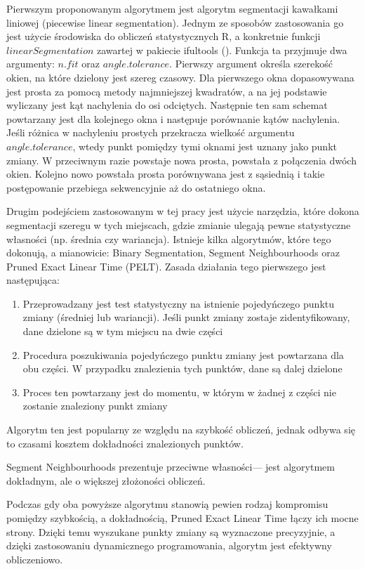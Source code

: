 \documentclass[polish, twoside, 12pt, a4paper]{article}
\theoremstyle{definition}
\theoremstyle{plain}
\theoremstyle{remark}
\begin{document}
Pierwszym proponowanym algorytmem jest algorytm segmentacji kawałkami liniowej (piecewise linear segmentation). Jednym ze sposobów zastosowania go jest użycie środowiska do obliczeń statystycznych R, a konkretnie funkcji \(linearSegmentation\) zawartej w pakiecie ifultools (\cite{ifultools}). Funkcja ta przyjmuje dwa argumenty: \(n.fit\) oraz \(angle.tolerance\). Pierwszy argument określa szerekość okien, na które dzielony jest szereg czasowy. Dla pierwszego okna dopasowywana jest prosta za pomocą metody najmniejszej kwadratów, a na jej podstawie wyliczany jest kąt nachylenia do osi odciętych. Następnie ten sam schemat powtarzany jest dla kolejnego okna i następuje porównanie kątów nachylenia. Jeśli różnica w nachyleniu prostych przekracza wielkość argumentu \(angle.tolerance\), wtedy punkt pomiędzy tymi oknami jest uznany jako punkt zmiany. W przeciwnym razie powstaje nowa prosta, powstała z połączenia dwóch okien. Kolejno nowo powstała prosta porównywana jest z sąsiednią i takie postępowanie przebiega sekwencyjnie aż do ostatniego okna.

Drugim podejściem zastosowanym w tej pracy jest użycie narzędzia, które dokona segmentacji szeregu w tych miejscach, gdzie zmianie ulegają pewne statystyczne własności (np. średnia czy wariancja). Istnieje kilka algorytmów, które tego dokonują, a mianowicie: Binary Segmentation, Segment Neighbourhoods oraz Pruned Exact Linear Time (PELT). Zasada działania tego pierwszego jest następująca:
\begin{enumerate}
  \item Przeprowadzany jest test statystyczny na istnienie pojedyńczego punktu zmiany (średniej lub wariancji). Jeśli punkt zmiany zostaje zidentyfikowany, dane dzielone są w tym miejscu na dwie części
  \item Procedura poszukiwania pojedyńczego punktu zmiany jest powtarzana dla obu części. W przypadku znalezienia tych punktów, dane są dalej dzielone
  \item Proces ten powtarzany jest do momentu, w którym w żadnej z części nie zostanie znaleziony punkt zmiany
\end{enumerate}
 
Algorytm ten jest popularny ze względu na szybkość obliczeń, jednak odbywa się to czasami kosztem dokładności znalezionych punktów.

Segment Neighbourhoods prezentuje przeciwne własności--- jest algorytmem dokładnym, ale o większej złożoności obliczeń.

Podczas gdy oba powyższe algorytmu stanowią pewien rodzaj kompromisu pomiędzy szybkością, a dokładnością, Pruned Exact Linear Time łączy ich mocne strony. Dzięki temu wyszukane punkty zmiany są wyznaczone precyzyjnie, a dzięki zastosowaniu dynamicznego programowania, algorytm jest efektywny obliczeniowo.
\end{document}
